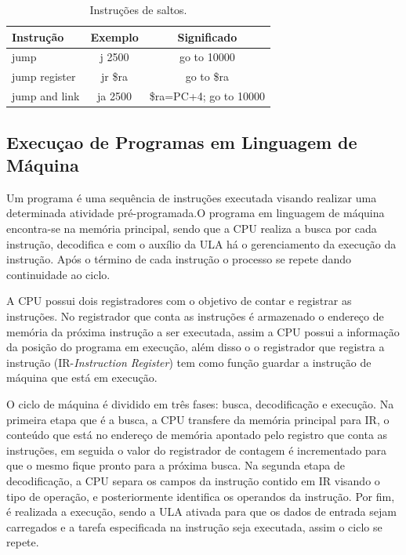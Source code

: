 \documentclass[10pt,twocolumn,letterpaper]{article}
\begin{document}
\begin{table}[h]
\renewcommand{\tablename}{Tabela}
\begin{center}
\begin{tabular}{|l|c||c|}
\hline
Instrução & Exemplo & Significado \\
\hline\hline
jump & j 2500 & go to 10000\\
jump register & jr \$ra & go to \$ra\\
jump and link & ja 2500 & \$ra=PC+4; go to 10000\\
\hline
\end{tabular}
\end{center}
\caption{Instruções de saltos.}
\end{table}

\subsection{Execuçao de Programas em Linguagem de Máquina}

Um programa é uma sequência de instruções executada visando realizar uma determinada atividade pré-programada.O programa em linguagem de máquina encontra-se na memória principal, sendo que a CPU realiza a busca por cada instrução, decodifica e com o auxílio da ULA há o gerenciamento da execução da instrução. Após o término de cada instrução o processo se repete dando continuidade ao ciclo. 

A CPU possui dois registradores com o objetivo de contar e registrar as instruções. No registrador que conta as instruções é armazenado o endereço de memória da próxima instrução a ser executada, assim a CPU possui a informação da posição do programa em execução, além disso o o registrador que registra a instrução (IR-\textit{Instruction Register}) tem como função guardar a instrução de máquina que está em execução.

O ciclo de máquina é dividido em três fases: busca, decodificação e execução. Na primeira etapa que é a busca, a CPU transfere da memória principal para IR, o conteúdo que está no endereço de memória apontado pelo registro que conta as instruções, em seguida o valor do registrador de contagem é incrementado para que o mesmo fique pronto para a próxima busca. Na segunda etapa de decodificação, a CPU separa os campos da instrução contido em IR visando o tipo de operação, e posteriormente identifica os operandos da instrução. Por fim, é realizada a execução, sendo a ULA ativada para que os dados de entrada sejam carregados e a tarefa especificada na instrução seja executada, assim o ciclo se repete.
\end{document}

